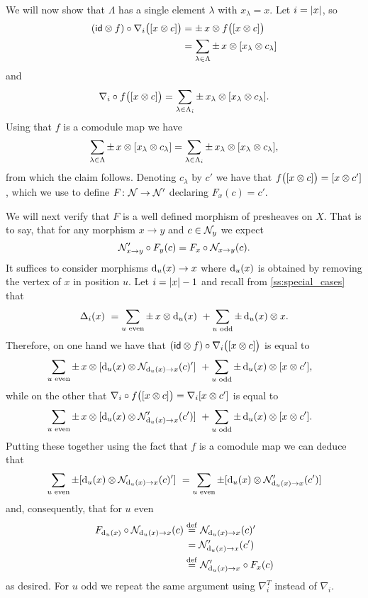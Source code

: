 We will now show that $\Lambda$ has a single element $\lambda$ with $x_\lambda = x$.
Let $i = \lvert x\rvert$, so
\begin{align*}
	(\mathsf{id} \otimes f) \circ \nabla_i \big( [x \otimes c] \big) &=
	\pm \, x \otimes f \big( [x \otimes c] \big) \\&=
	\sum_{\lambda \in \Lambda} \pm \, x \otimes [x_\lambda \otimes c_\lambda]
\end{align*}
and
\[
\nabla_i \circ f \big( [x \otimes c] \big) =
\sum_{\lambda \in \Lambda_i} \pm \, x_\lambda \otimes [x_\lambda \otimes c_\lambda].
\]
Using that $f$ is a comodule map we have
\[
\sum_{\lambda \in \Lambda} \pm \, x \otimes [x_\lambda \otimes c_\lambda] =
\sum_{\lambda \in \Lambda_i} \pm \, x_\lambda \otimes [x_\lambda \otimes c_\lambda],
\]
from which the claim follows.
Denoting $c_\lambda$ by $c'$ we have that $f \big( [x \otimes c] \big) = [x \otimes c']$, which we use to define $F \colon \mathcal{N} \to \mathcal{N}'$ declaring $F_x(c) = c'$.

We will next verify that $F$ is a well defined morphism of presheaves on $X$.
That is to say, that for any morphism $x \to y$ and $c \in \mathcal{N}_y$ we expect
\[
\mathcal{N}'_{x \to y} \circ F_y(c) = F_x \circ \mathcal{N}_{x \to y}(c).
\]
It suffices to consider morphisms $\operatorname{d}_u(x) \to x$ where $\operatorname{d}_u(x)$ is obtained by removing the vertex of $x$ in position $u$.
Let $i = \lvert x\rvert-1$ and recall from \cref{ss:special_cases} that
\[
\operatorname{\Delta}_i(x) \ =
\sum_{u \text{ even}} \pm \, x \otimes \operatorname{d}_u(x) \ +
\sum_{u \text{ odd}} \pm \operatorname{d}_u(x) \otimes x.
\]
Therefore, on one hand we have that $(\mathsf{id} \otimes f) \circ \nabla_i \big( [x \otimes c] \big)$ is equal to
\begin{align*}
	&\sum_{u \text{ even}} \pm \, x \otimes [\operatorname{d}_u(x) \otimes \mathcal{N}_{\operatorname{d}_u(x) \to x}(c)'] \ +
	\sum_{u \text{ odd}} \pm \operatorname{d}_u(x) \otimes [x \otimes c'],
\end{align*}
while on the other that $\nabla_i \circ f \big( [x \otimes c] \big) = \nabla_i [x \otimes c']$ is equal to
\begin{align*}
	&\sum_{u \text{ even}} \pm \, x \otimes [\operatorname{d}_u(x) \otimes \mathcal{N}'_{\operatorname{d}_u(x) \to x}(c')] \ +
	\sum_{u \text{ odd}} \pm \operatorname{d}_u(x) \otimes [x \otimes c'].
\end{align*}
Putting these together using the fact that $f$ is a comodule map we can deduce that
\[
\sum_{u \text{ even}} \pm [\operatorname{d}_u(x) \otimes \mathcal{N}_{\operatorname{d}_u(x) \to x}(c)'] \ =
\sum_{u \text{ even}} \pm [\operatorname{d}_u(x) \otimes \mathcal{N}'_{\operatorname{d}_u(x) \to x}(c')]
\]
and, consequently, that for $u$ even
\begin{align*}
	F_{\operatorname{d}_u(x)} \circ \mathcal{N}_{\operatorname{d}_u(x) \to x}(c) &\stackrel{\mathrm{def}}{=}
	\mathcal{N}_{\operatorname{d}_u(x) \to x}(c)' \\ &\,=
	\mathcal{N}'_{\operatorname{d}_u(x) \to x}(c') \\ &\stackrel{\mathrm{def}}{=}
	\mathcal{N}'_{\operatorname{d}_u(x) \to x} \circ F_{x}(c)
\end{align*}
as desired.
For $u$ odd we repeat the same argument using $\nabla_i^T$ instead of $\nabla_i$.